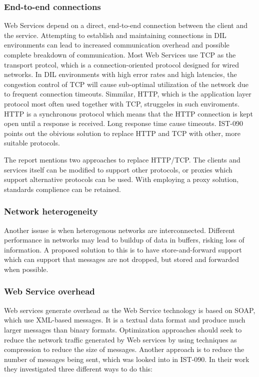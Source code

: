\documentclass[USenglish]{ifimaster}
\begin{document}
\label{section:DIL-problems}

\subsubsection{End-to-end connections}

Web Services depend on a direct, end-to-end connection between the client and
the service. Attempting to establish and maintaining connections in DIL
environments can lead to increased communication overhead and possible complete
breakdown of communication. Most Web Services use TCP as the transport protcol,
which is a connection-oriented protocol designed for wired networks. In DIL
environments with high error rates and high latencies, the congestion control of
TCP will cause sub-optimal utilization of the network due to frequent connection
timeouts. Simmilar, HTTP, which is the application layer protocol most often
used together with TCP, struggeles in such enviroments. HTTP is a synchronous
protocol which means that the HTTP connection is kept open until a response is
received. Long response time cause timeouts. IST-090 points out the obivious
solution to replace HTTP and TCP with other, more suitable protocols.

The report mentions two approaches to replace HTTP/TCP. The clients and services
itself can be modified to support other protocols, or proxies which support
alternative protocols can be used. With employing a proxy solution, standards
complience can be retained.


\subsubsection{Network heterogeneity}

Another issuse is when heterogenous networks are interconnected. Different
performance in networks may lead to buildup of data in buffers, risking loss of
information. A proposed solution to this is to have store-and-forward support
which can support that messages are not dropped, but stored and forwarded when
possible.


\subsubsection{Web Service overhead}

Web services generate overhead as the Web Service technology is based on SOAP,
which use XML-based messages. It is a textual data format and produce much
larger messages than binary formats. Optimization approaches should seek to
reduce the network traffic generated by Web services by using techniques as
compression to reduce the size of messages. Another approach is to reduce the
number of messages being sent, which was looked into in IST-090\cite{IST-090}. In
their work they investigated three different ways to do this:
\end{document}
